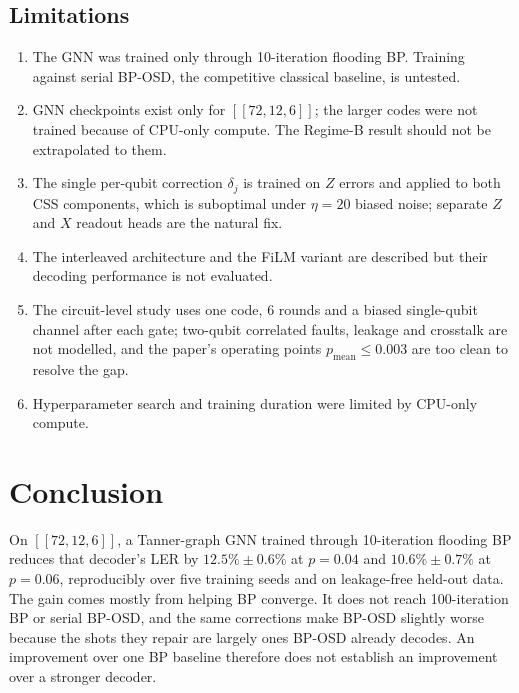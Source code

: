 \documentclass[a4paper,twocolumn,11pt,nopdfoutputerror]{quantumarticle}
\newcommand{\code}[3]{\ensuremath{[\![#1,#2,#3]\!]}}
\begin{document}
\subsection{Limitations}\label{sec:limitations}

\begin{enumerate}[leftmargin=*,topsep=3pt,itemsep=2pt,label=(\roman*)]
\item The GNN was trained only through 10-iteration flooding BP. Training
      against serial BP-OSD, the competitive classical baseline, is untested.
\item GNN checkpoints exist only for $\code{72}{12}{6}$; the larger codes
      were not trained because of CPU-only compute. The Regime-B result
      should not be extrapolated to them.
\item The single per-qubit correction $\delta_j$ is trained on $Z$ errors
      and applied to both CSS components, which is suboptimal under
      $\eta=20$ biased noise; separate $Z$ and $X$ readout heads are the
      natural fix.
\item The interleaved architecture and the FiLM variant are described but
      their decoding performance is not evaluated.
\item The circuit-level study uses one code, 6 rounds and a biased
      single-qubit channel after each gate; two-qubit correlated faults,
      leakage and crosstalk are not modelled, and the paper's operating
      points $p_\mathrm{mean}\le0.003$ are too clean to resolve the gap.
\item Hyperparameter search and training duration were limited by CPU-only
      compute.
\end{enumerate}

\section{Conclusion}\label{sec:conclusion}

On $\code{72}{12}{6}$, a Tanner-graph GNN trained through 10-iteration
flooding BP reduces that decoder's LER by $12.5\%\pm0.6\%$ at $p=0.04$
and $10.6\%\pm0.7\%$ at $p=0.06$, reproducibly over five training seeds
and on leakage-free held-out data. The gain comes mostly from helping BP
converge. It does not reach 100-iteration BP or serial BP-OSD, and the
same corrections make BP-OSD slightly worse because the shots they repair
are largely ones BP-OSD already decodes. An improvement over one BP
baseline therefore does not establish an improvement over a stronger
decoder.
\end{document}
